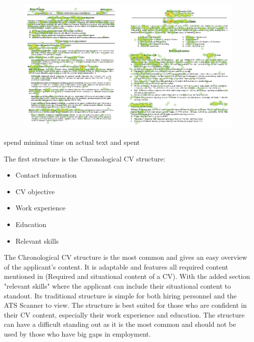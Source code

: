 \begin{figure}[H]
   \centering
   \includegraphics[scale = 0.5]{figures/Eye_Tracking_Study}
   \caption{ \cite{Eye_Tracking_Study}}
   \label{fig:Eye_Tracking_Study}
 \end{figure}

spend minimal time on actual text and spent 

The first structure is the Chronological CV structure: \\
\begin{itemize}
   \item  Contact information
   \item  CV objective
   \item  Work experience
   \item  Education
   \item  Relevant skills
   \end{itemize}
The Chronological CV structure is the most common and gives an easy overview of the applicant's content.
It is adaptable and features all required content mentioned in (Required and situational content of a CV).
With the added section "relevant skills" where the applicant can include their situational content to standout.
Its traditional structure is simple for both hiring personnel and the ATS Scanner to view.
The structure is best suited for those who are confident in their CV content, especially their work experience and education.
The structure can have a difficult standing out as it is the most common and should not be used by those who have big gaps in employment.\\
   
